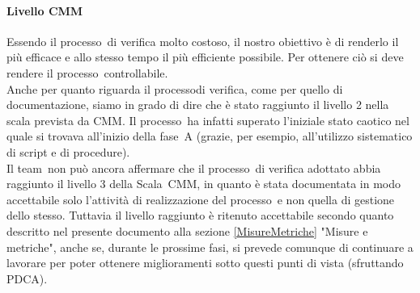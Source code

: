 \documentclass[../PianoDiQualifica.tex]{subfiles}
\begin{document}
\begin{appendices}
			\paragraph{Livello CMM}
			Essendo il processo\g\ di verifica molto costoso, il nostro obiettivo è di renderlo il più efficace e allo stesso tempo il più efficiente possibile. Per ottenere ciò si deve rendere il processo\g\ controllabile.\\
			Anche per quanto riguarda il processo\g di verifica, come per quello di documentazione, siamo in grado di dire che è stato raggiunto il livello 2 nella scala prevista da CMM\g. Il processo\g\ ha infatti superato l'iniziale stato caotico nel quale si trovava all'inizio della fase\g\ A (grazie, per esempio, all'utilizzo sistematico di script e di procedure). \\
			Il team\g\ non può ancora affermare che il processo\g\ di verifica adottato abbia raggiunto il livello 3 della Scala\g\ CMM\g, in quanto è stata documentata in modo accettabile solo l'attività di realizzazione del processo\g\ e non quella di gestione dello stesso. Tuttavia il livello raggiunto è ritenuto accettabile secondo quanto descritto nel presente documento alla sezione \ref{MisureMetriche} "Misure e metriche", anche se, durante le prossime fasi, si prevede comunque di continuare a lavorare per poter ottenere miglioramenti sotto questi punti di vista (sfruttando PDCA\g).
\end{appendices}
\end{document}
